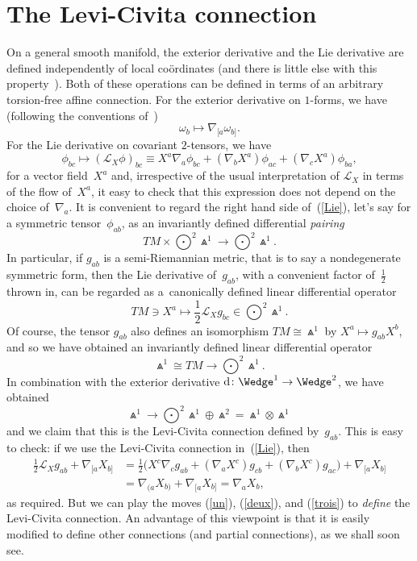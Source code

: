 \documentclass[pdftex]{sigma}%
\numberwithin{equation}{section}
\begin{document}
\section{The Levi-Civita connection}\label{LC}
On a general smooth manifold, the exterior derivative and the Lie derivative
are defined independently of local co\"ordinates (and there is little else with
this property~\cite{KMS}). Both of these operations can be defined in terms of
an arbitrary torsion-free affine connection. For the exterior derivative on
$1$-forms, we have (following the conventions of~\cite[equation~(4.3.14)]{OT})
\[\omega_b\longmapsto\nabla_{[a}\omega_{b]}.\]
For the Lie derivative on covariant $2$-tensors, we have
\begin{equation}\label{Lie}
\phi_{bc}\longmapsto({\mathcal{L}}_X\phi)_{bc}\equiv
X^a\nabla_a\phi_{bc}+(\nabla_bX^a)\phi_{ac}+(\nabla_cX^a)\phi_{ba},
\end{equation}
for a vector field~$X^a$ and, irrespective of the usual interpretation of
${\mathcal{L}}_X$ in terms of the flow of~$X^a$, it easy to check that this
expression does not depend on the choice of~$\nabla_a$. It is convenient to
regard the right hand side of~(\ref{Lie}), let's say for a symmetric
tensor~$\phi_{ab}$, as an invariantly defined differential {\em pairing}
\[\textstyle TM\times\bigodot^2\!\Wedge^1\longrightarrow
\bigodot^2\!\Wedge^1.\]
In particular, if $g_{ab}$ is a semi-Riemannian metric, that is to say a
nondegenerate symmetric form, then the Lie derivative of~$g_{ab}$, with a
convenient factor of~$\frac12$ thrown in, can be regarded as a~canonically
defined linear differential operator
\begin{equation}\label{un}
\textstyle TM\ni
X^a\longmapsto
\frac12{\mathcal{L}}_Xg_{bc}\in\bigodot^2\!\Wedge^1.\end{equation}
Of course,
the tensor $g_{ab}$ also defines an isomorphism $TM\cong\Wedge^1$ by
$X^a\mapsto g_{ab}X^b$, and so we have obtained an invariantly defined linear
differential operator
\begin{equation}\label{deux}
\textstyle\Wedge^1\cong TM\longrightarrow\bigodot^2\!\Wedge^1.\end{equation}
In combination with the exterior derivative ${\rm d}\colon \Wedge^1\to\Wedge^2$, we have
obtained
\begin{equation}\label{trois}
\textstyle\Wedge^1\longrightarrow\bigodot^2\!\Wedge^1\oplus\Wedge^2=
\Wedge^1\otimes\Wedge^1\end{equation}
and we claim that this is the Levi-Civita connection defined by~$g_{ab}$. This
is easy to check: if we use the Levi-Civita connection in~(\ref{Lie}), then
\begin{align*}\tfrac12{\mathcal{L}}_Xg_{ab}+\nabla_{[a}X_{b]}
&= \tfrac12\big(X^c\nabla_cg_{ab}+(\nabla_aX^c)g_{cb}+(\nabla_bX^c)g_{ac}\big) +\nabla_{[a}X_{b]}\\
&= \nabla_{(a}X_{b)}+\nabla_{[a}X_{b]}=\nabla_aX_b,
\end{align*}
as required. But we can play the moves (\ref{un}), (\ref{deux}), and
(\ref{trois}) to {\em define} the Levi-Civita connection. An advantage of
this viewpoint is that it is easily modified to define other connections (and
partial connections), as we shall soon see.
\end{document}
